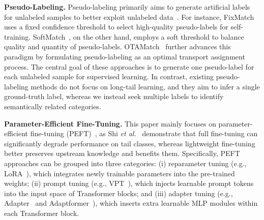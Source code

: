 \noindent \textbf{Pseudo-Labeling.}
Pseudo-labeling primarily aims to generate artificial labels for unlabeled samples to better exploit unlabeled data~\cite{hu2021simple, wang2022debiased, abdelfattah2023cdul}. For instance, FixMatch~\cite{sohn2020fixmatch} uses a fixed confidence threshold to select high-quality pseudo-labels for self-training. SoftMatch~\cite{chen2023softmatch}, on the other hand, employs a soft threshold to balance quality and quantity of pseudo-labels. OTAMatch~\cite{zhang2024otamatch} further advances this paradigm by formulating pseudo-labeling as an optimal transport assignment process. The central goal of these approaches is to generate one pseudo-label for each unlabeled sample for supervised learning. In contrast, existing pseudo-labeling methods do not focus on long-tail learning, and they aim to infer a single ground-truth label, whereas we instead seek multiple labels to identify semantically related categories.

\noindent \textbf{Parameter-Efficient Fine-Tuning.}
This paper mainly focuses on parameter-efficient fine-tuning (PEFT)~\cite{xin2024parameter, mai2025lessons, fu2025dtl}, as Shi \textit{et al.}~\cite{shi2024long} demonstrate that full fine-tuning can significantly degrade performance on tail classes, whereas lightweight fine-tuning better preserves upstream knowledge and benefits them. Specifically, PEFT approaches can be grouped into three categories: (i) reparameter tuning (e.g., LoRA~\cite{hu2022lora}), which integrates newly trainable parameters into the pre-trained weights; (ii) prompt tuning (e.g., VPT~\cite{jia2022visual}), which injects learnable prompt tokens into the input space of Transformer blocks; and (iii) adapter tuning (e.g., Adapter~\cite{houlsby2019parameter} and Adaptformer~\cite{chen2022adaptformer}), which inserts extra learnable MLP modules within each Transformer block.
